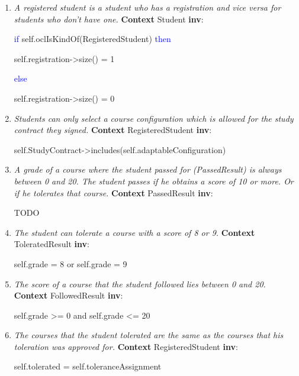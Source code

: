 \begin{enumerate}
	\item  \emph{A registered student is a student who has a registration and vice
	versa for students who don't have one.}
	\npar \textbf{Context} Student \textbf{inv}:
	\par \hspace*{5 mm} \textcolor{Blue}{if}
	self.oclIsKindOf(RegisteredStudent) \textcolor{Blue}{then}
	\par \hspace*{10 mm} self.registration->size() = 1
	\par \hspace*{5 mm} \textcolor{Blue}{else}
	\par \hspace*{10 mm} self.registration->size() = 0
	
	\item \emph{Students can only select a course configuration which is allowed
	for the study contract they signed.}
	\npar \textbf{Context} RegisteredStudent \textbf{inv}:
	\par \hspace*{5 mm} self.StudyContract->includes(self.adaptableConfiguration)
	
	\item \emph{A grade of a course where the student passed for (PassedResult) is
	always between 0 and 20. The student passes if he obtains a score of 10 or
	more. Or if he tolerates that course.}
	\npar \textbf{Context} PassedResult \textbf{inv}:
	\par TODO
	
	
	\item \emph{The student can tolerate a course with a score of 8 or 9.}
	\npar \textbf{Context} ToleratedResult \textbf{inv}:
	\par \hspace*{5 mm} self.grade = 8 or self.grade = 9
	
	\item \emph{The score of a course that the student followed lies between 0 and
	20.}
	\npar \textbf{Context} FollowedResult \textbf{inv}:
	\par \hspace*{5 mm} self.grade >= 0 and self.grade <= 20
	
	\item \emph{The courses that the student tolerated are the same as the courses
	that his toleration was approved for.}
	\npar \textbf{Context} RegisteredStudent \textbf{inv}:
	\par \hspace*{5 mm} self.tolerated = self.toleranceAssignment
	
\end{enumerate}

